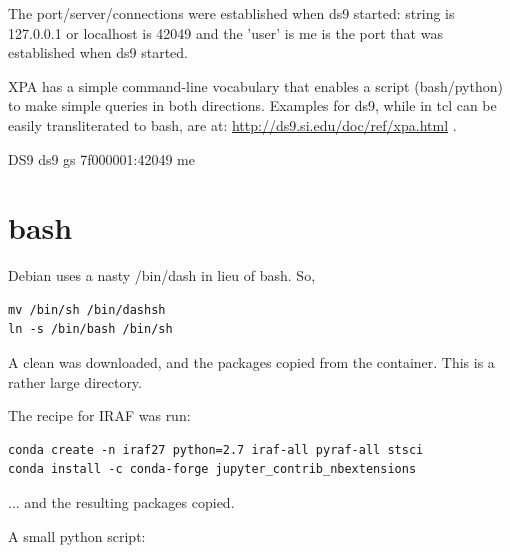 \documentclass[letter,11pt,oneside]{article}
\newcommand{\dhl}[1]{{\color{verbcolor}{\texttt#1}}}
\begin{document}
The port/server/connections were established when ds9 started:
\dhl{7f000001} string is 127.0.0.1 or localhost is 42049 and the
'user' is me is the port that was established when ds9 started.

XPA has a simple command-line vocabulary that enables a script
(bash/python) to make simple queries in both directions.  Examples for
ds9, while in tcl can be easily transliterated to bash, are at:
\url{http://ds9.si.edu/doc/ref/xpa.html} .


DS9 ds9 gs 7f000001:42049 me
\section{bash}

Debian uses a nasty /bin/dash in lieu of bash.
So, 

\begin{tcolorbox}
\begingroup \fontsize{10pt}{10pt}
\selectfont
\begin{verbatim} 
mv /bin/sh /bin/dashsh
ln -s /bin/bash /bin/sh 
\end{verbatim}
\endgroup
\end{tcolorbox}


A clean \dhl{continuumio/anaconda3} was downloaded, and the packages copied
from the container. This is a rather large directory.

The recipe for IRAF was run:

\begin{tcolorbox}
  \begingroup \fontsize{10pt}{10pt}
\selectfont
\begin{verbatim} 
conda create -n iraf27 python=2.7 iraf-all pyraf-all stsci
conda install -c conda-forge jupyter_contrib_nbextensions
\end{verbatim}
\endgroup
\end{tcolorbox}

... and the resulting packages copied.

A small python script:
\end{document}
